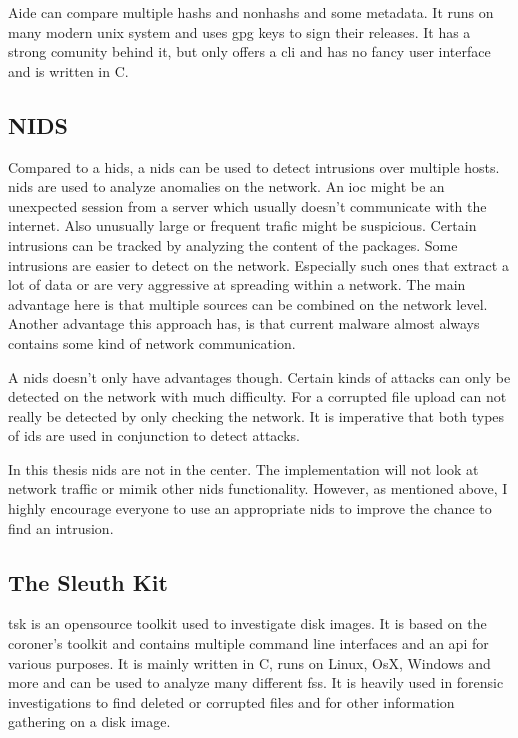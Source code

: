 Aide can compare multiple \glspl{hash} and \glspl{nonhash} and some \gls{metadata}. It runs on many modern unix system \cite{aide} and uses gpg keys to sign their releases. It has a strong comunity behind it, but only offers a \gls{cli} and has no fancy user interface and is written in C. \cite{aide:github} 


\subsection{NIDS}
\label{sec:def:nids}

Compared to a \gls{hids}, a \gls{nids} can be used to detect intrusions over multiple hosts. \gls{nids} are used to analyze anomalies on the network. An \gls{ioc}	might be an unexpected session from a server which usually doesn't communicate with the internet. Also unusually large or frequent trafic might be suspicious. Certain intrusions can be tracked by analyzing the content of the packages. Some intrusions are easier to detect on the network. Especially such ones that extract a lot of data or are very aggressive at spreading within a network. The main advantage here is that multiple sources can be combined on the network level. Another advantage this approach has, is that current \gls{malware} almost always contains some kind of network communication. \cite{Malware:Behaviour,nids}

A \gls{nids} doesn't only have advantages though. Certain kinds of attacks can only be detected on the network with much difficulty. For a corrupted file upload can not really be detected by only checking the network. It is imperative that both types of \gls{ids} are used in conjunction to detect attacks. 

In this thesis \gls{nids} are not in the center. The implementation will not look at network traffic or mimik other \gls{nids} functionality. However, as mentioned above, I highly encourage everyone to use an appropriate \gls{nids} to improve the chance to find an intrusion. 

\subsection{The Sleuth Kit}
\label{sec:tsk}

\gls{tsk} is an \gls{opensource} toolkit used to investigate disk images. It is based on the coroner's toolkit \cite{tct} and contains multiple command line interfaces and an \gls{api} for various purposes. \cite{tsk, tsk:about} It is mainly written in C, runs on Linux, OsX, Windows and more and can be used to analyze many different \glspl{fs}. It is heavily used in forensic investigations to find deleted or corrupted files and for other information gathering on a disk image.

